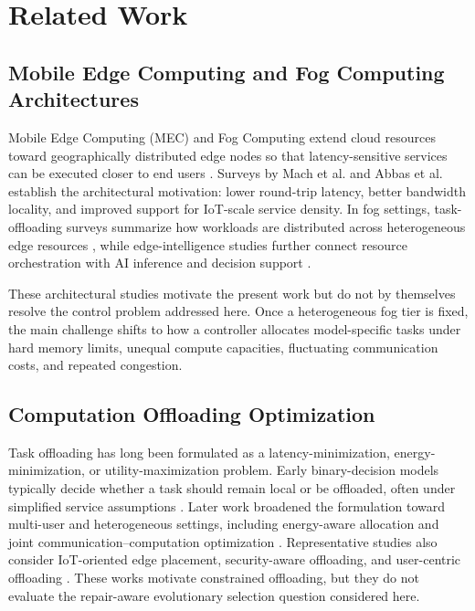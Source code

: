 \section{Related Work}

\subsection{Mobile Edge Computing and Fog Computing Architectures}
Mobile Edge Computing (MEC) and Fog Computing extend cloud resources toward geographically distributed edge nodes so that latency-sensitive services can be executed closer to end users \cite{Mao2017, Shi2016}. Surveys by Mach et al. \cite{Mach2017} and Abbas et al. \cite{Abbas2018} establish the architectural motivation: lower round-trip latency, better bandwidth locality, and improved support for IoT-scale service density. In fog settings, task-offloading surveys summarize how workloads are distributed across heterogeneous edge resources \cite{Kumari2022}, while edge-intelligence studies further connect resource orchestration with AI inference and decision support \cite{Zhou2019}.

These architectural studies motivate the present work but do not by themselves resolve the control problem addressed here. Once a heterogeneous fog tier is fixed, the main challenge shifts to how a controller allocates model-specific tasks under hard memory limits, unequal compute capacities, fluctuating communication costs, and repeated congestion.

\subsection{Computation Offloading Optimization}
Task offloading has long been formulated as a latency-minimization, energy-minimization, or utility-maximization problem. Early binary-decision models typically decide whether a task should remain local or be offloaded, often under simplified service assumptions \cite{Zhang2016}. Later work broadened the formulation toward multi-user and heterogeneous settings, including energy-aware allocation and joint communication--computation optimization \cite{Chen2018, You2017, Liu2016, Bi2018, Zhou2019, Deng2020}. Representative studies also consider IoT-oriented edge placement, security-aware offloading, and user-centric offloading \cite{Sun2016, Premsankar2018, Samy2022, Deng2021}. These works motivate constrained offloading, but they do not evaluate the repair-aware evolutionary selection question considered here.


